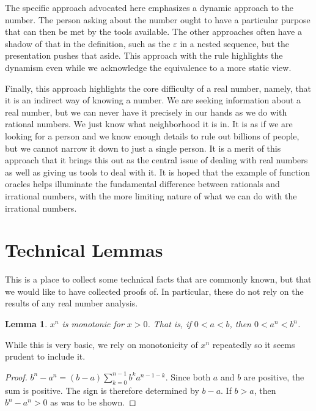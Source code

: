 \documentclass[12pt]{article}
\newtheorem{lemma}{Lemma}
\theoremstyle{remark}
\begin{document}
The specific approach advocated here emphasizes a dynamic approach to the number. The person asking about the number ought to have a particular purpose that can then be met by the tools available. The other approaches often have a shadow of that in the definition, such as the $\varepsilon$ in a nested sequence, but the presentation pushes that aside. This approach with the rule highlights the dynamism even while we acknowledge the equivalence to a more static view. 

Finally, this approach highlights the core difficulty of a real number, namely, that it is an indirect way of knowing a number. We are seeking information about a real number, but we can never have it precisely in our hands as we do with rational numbers. We just know what neighborhood it is in. It is as if we are looking for a person and we know enough details to rule out billions of people, but we cannot narrow it down to just a single person. It is a merit of this approach that it brings this out as the central issue of dealing with real numbers as well as giving us tools to deal with it. It is hoped that the example of function oracles helps illuminate the fundamental difference between rationals and irrational numbers, with the more limiting nature of what we can do with the irrational numbers. 

\appendix

\section{Technical Lemmas}\label{app:A}

This is a place to collect some technical facts that are commonly known, but that we would like to have collected proofs of. In particular, these do not rely on the results of any real number analysis. 

\begin{lemma}
$x^n$ is monotonic for $x>0$. That is, if $0 < a < b$, then $0 < a^n<b^n$.
\end{lemma}

While this is very basic, we rely on monotonicity of $x^n$ repeatedly so it seems prudent to include it. 

\begin{proof}
$b^n-a^n= (b-a)\sum_{k=0}^{n-1} b^k a^{n-1-k}$. Since both $a$ and $b$ are positive, the sum is positive. The sign is therefore determined by $b-a$. If $b>a$, then $b^n-a^n > 0$ as was to be shown. 
\end{proof}
\end{document}
